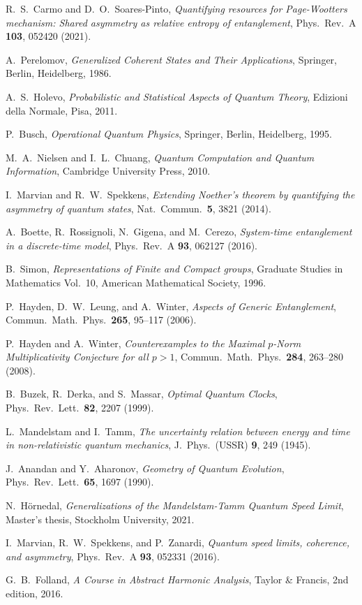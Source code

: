 \documentclass[aps,10pt,twocolumn,showpacs,pra,citeautoscript,amsmath,amssymb,floatfix,superscriptaddress]{revtex4-1}
\begin{document}
\begin{thebibliography}{47}
R.\ S.\ Carmo and D.\ O.\ Soares-Pinto, \emph{Quantifying resources for Page-Wootters mechanism: Shared asymmetry as relative entropy of entanglement}, Phys.\ Rev.\ A \textbf{103}, 052420 (2021).

A.\ Perelomov, \emph{Generalized Coherent States and Their Applications}, Springer, Berlin, Heidelberg, 1986.

A.\ S.\ Holevo, \emph{Probabilistic and Statistical Aspects of Quantum Theory}, Edizioni della Normale, Pisa, 2011.

P.\ Busch, \emph{Operational Quantum Physics}, Springer, Berlin, Heidelberg, 1995.

M.\ A.\ Nielsen and I.\ L.\ Chuang, \emph{Quantum Computation and Quantum Information}, Cambridge University Press, 2010.

I.\ Marvian and R.\ W.\ Spekkens, \emph{Extending Noether's theorem by quantifying the asymmetry of quantum states}, Nat.\ Commun.\ \textbf{5}, 3821 (2014).

A.\ Boette, R.\ Rossignoli, N.\ Gigena, and M.\ Cerezo, \emph{System-time entanglement in a discrete-time model}, Phys.\ Rev.\ A \textbf{93}, 062127 (2016).

B.\ Simon, \emph{Representations of Finite and Compact groups}, Graduate Studies in Mathematics Vol.\ 10, American Mathematical Society, 1996.

P.\ Hayden, D.\ W.\ Leung, and A.\ Winter, \emph{Aspects of Generic Entanglement}, Commun.\ Math.\ Phys.\ \textbf{265}, 95--117 (2006).

P.\ Hayden and A.\ Winter, \emph{Counterexamples to the Maximal $p$-Norm Multiplicativity Conjecture for all $p>1$}, Commun.\ Math.\ Phys.\ \textbf{284}, 263--280 (2008).

B.\ Buzek, R.\ Derka, and S.\ Massar, \emph{Optimal Quantum Clocks}, Phys.\ Rev.\ Lett.\ \textbf{82}, 2207 (1999).

L.\ Mandelstam and I.\ Tamm, \emph{The uncertainty relation between energy and time in non-relativistic quantum mechanics}, J.\ Phys.\ (USSR) \textbf{9}, 249 (1945).

J.\ Anandan and Y.\ Aharonov, \emph{Geometry of Quantum Evolution}, Phys.\ Rev.\ Lett.\ \textbf{65}, 1697 (1990).

N.\ H\"ornedal, \emph{Generalizations of the Mandelstam-Tamm Quantum Speed Limit}, Master's thesis, Stockholm University, 2021.

I.\ Marvian, R.\ W.\ Spekkens, and P.\ Zanardi, \emph{Quantum speed limits, coherence, and asymmetry}, Phys.\ Rev.\ A \textbf{93}, 052331 (2016).

G.\ B.\ Folland, \emph{A Course in Abstract Harmonic Analysis}, Taylor \& Francis, 2nd edition, 2016.

\end{thebibliography}
\end{document}
